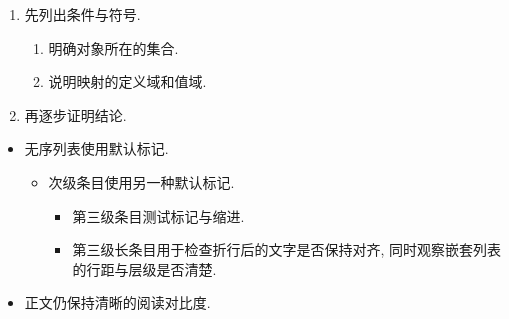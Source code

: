 \documentclass[UTF8,12pt,oneside,fontset=fandol,notitlepage]{ctexart}
\theoremstyle{mtfang}
\theoremstyle{definition}
\theoremstyle{definition}
\begin{document}
\begin{enumerate}
    \item
        先列出条件与符号.
        \begin{enumerate}
            \item
                明确对象所在的集合.
            \item
                说明映射的定义域和值域.
        \end{enumerate}
    \item
        再逐步证明结论.
\end{enumerate}
\begin{itemize}
    \item
        无序列表使用默认标记.
        \begin{itemize}
            \item
                次级条目使用另一种默认标记.
                \begin{itemize}
                    \item
                        第三级条目测试标记与缩进.
                    \item
                        第三级长条目用于检查折行后的文字是否保持对齐,
                        同时观察嵌套列表的行距与层级是否清楚.
                \end{itemize}
        \end{itemize}
    \item
        正文仍保持清晰的阅读对比度.
\end{itemize}
\end{document}
